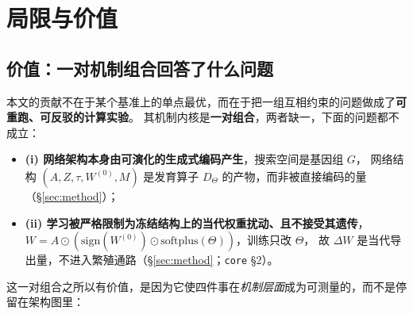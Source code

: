 \section{局限与价值}\label{sec:limitations}

\subsection{价值：一对机制组合回答了什么问题}

本文的贡献不在于某个基准上的单点最优，而在于把一组互相约束的问题做成了\textbf{可重跑、可反驳的计算实验}。
其机制内核是\textbf{一对组合}，两者缺一，下面的问题都不成立：

\begin{itemize}
  \item \textbf{(i) 网络架构本身由可演化的生成式编码产生}，搜索空间是基因组 $G$，
        网络结构 $(A,Z,\tau,W^{(0)},M)$ 是发育算子 $D_\Theta$ 的产物，而非被直接编码的量（\S\ref{sec:method}）；
  \item \textbf{(ii) 学习被严格限制为冻结结构上的当代权重扰动、且不接受其遗传}，
        $W=A\odot(\mathrm{sign}(W^{(0)})\odot\mathrm{softplus}(\Theta))$，训练只改 $\Theta$，
        故 $\Delta W$ 是当代导出量，不进入繁殖通路（\S\ref{sec:method}；\texttt{core} \S2）。
\end{itemize}

这一对组合之所以有价值，是因为它使四件事在\emph{机制层面}成为可测量的，而不是停留在架构图里：

